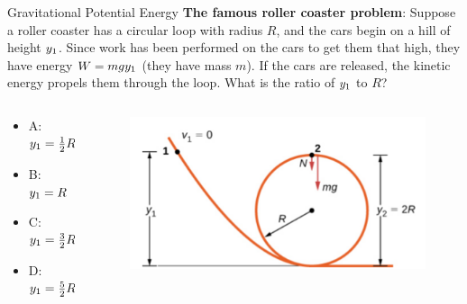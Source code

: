\documentclass{beamer}
\begin{document}
\begin{frame}{Gravitational Potential Energy}
\textbf{The famous roller coaster problem}: Suppose a roller coaster has a circular loop with radius $R$, and the cars begin on a hill of height $y_{\rm 1}$.  Since work has been performed on the cars to get them that high, they have energy $W = mgy_{\rm 1}$ (they have mass $m$).  If the cars are released, the kinetic energy propels them through the loop.  What is the ratio of $y_{\rm 1}$ to $R$?
\begin{columns}[T]
\begin{column}{0.5\textwidth}
\begin{itemize}
\item A: $y_{\rm 1} = \frac{1}{2}R$
\item B: $y_{\rm 1} = R$
\item C: $y_{\rm 1} = \frac{3}{2}R$
\item D: $y_{\rm 1} = \frac{5}{2}R$
\end{itemize}
\end{column}
\begin{column}{0.5\textwidth}
\begin{figure}
\centering
\includegraphics[width=\textwidth]{figures/loop.png}
\end{figure}
\end{column}
\end{columns}
\end{frame}
\end{document}
